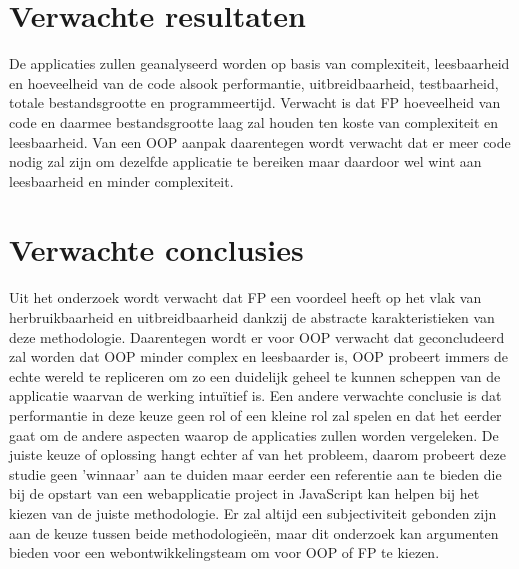 \section{Verwachte resultaten}
\label{sec:verwachte_resultaten}

De applicaties zullen geanalyseerd worden op basis van complexiteit, leesbaarheid en hoeveelheid van de code alsook performantie, uitbreidbaarheid, testbaarheid, totale bestandsgrootte en programmeertijd. Verwacht is dat FP hoeveelheid van code en daarmee bestandsgrootte laag zal houden ten koste van complexiteit en leesbaarheid. Van een OOP aanpak daarentegen wordt verwacht dat er meer code nodig zal zijn om dezelfde applicatie te bereiken maar daardoor wel wint aan leesbaarheid en minder complexiteit.  

\section{Verwachte conclusies}
\label{sec:verwachte_conclusies}


Uit het onderzoek wordt verwacht dat FP een voordeel heeft op het vlak van herbruikbaarheid en uitbreidbaarheid dankzij de abstracte karakteristieken van deze methodologie. Daarentegen wordt er voor OOP verwacht dat geconcludeerd zal worden dat OOP minder complex en leesbaarder is, OOP probeert immers de echte wereld te repliceren om zo een duidelijk geheel te kunnen scheppen van de applicatie waarvan de werking intuïtief is. Een andere verwachte conclusie is dat performantie in deze keuze geen rol of een kleine rol zal spelen en dat het eerder gaat om de andere aspecten waarop de applicaties zullen worden vergeleken.
De juiste keuze of oplossing hangt echter af van het probleem, daarom probeert deze studie geen 'winnaar' aan te duiden maar eerder een referentie aan te bieden die bij de opstart van een webapplicatie project in JavaScript kan helpen bij het kiezen van de juiste methodologie. Er zal altijd een subjectiviteit gebonden zijn aan de keuze tussen beide methodologieën, maar dit onderzoek kan argumenten bieden voor een webontwikkelingsteam om voor OOP of FP te kiezen.

